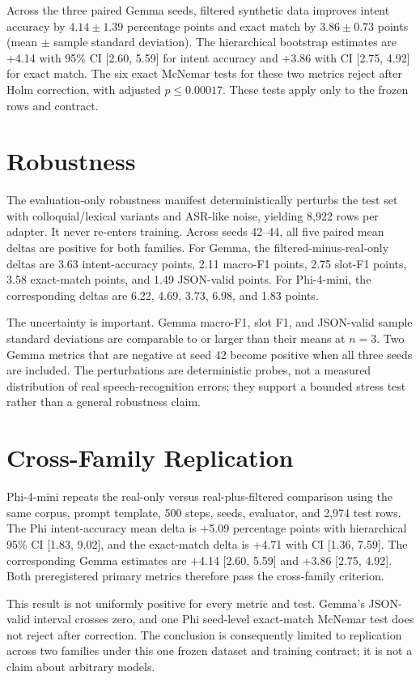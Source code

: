 \documentclass[11pt]{article}
\begin{document}
Across the three paired Gemma seeds, filtered synthetic data improves intent
accuracy by \(4.14 \pm 1.39\) percentage points and exact match by
\(3.86 \pm 0.73\) points (mean \(\pm\) sample standard deviation).  The
hierarchical bootstrap estimates are +4.14 with 95\% CI [2.60, 5.59] for intent
accuracy and +3.86 with CI [2.75, 4.92] for exact match.  The six exact McNemar
tests for these two metrics reject after Holm correction, with adjusted
\(p \leq 0.00017\).  These tests apply only to the frozen rows and contract.

\section{Robustness}
The evaluation-only robustness manifest deterministically perturbs the test set
with colloquial/lexical variants and ASR-like noise, yielding 8,922 rows per
adapter.  It never re-enters training.  Across seeds 42--44, all five paired mean
deltas are positive for both families.  For Gemma, the filtered-minus-real-only
deltas are 3.63 intent-accuracy points, 2.11 macro-F1 points, 2.75 slot-F1 points,
3.58 exact-match points, and 1.49 JSON-valid points.  For Phi-4-mini, the
corresponding deltas are 6.22, 4.69, 3.73, 6.98, and 1.83 points.

The uncertainty is important.  Gemma macro-F1, slot F1, and JSON-valid sample
standard deviations are comparable to or larger than their means at \(n=3\).
Two Gemma metrics that are negative at seed 42 become positive when all three
seeds are included.  The perturbations are deterministic probes, not a measured
distribution of real speech-recognition errors; they support a bounded stress
test rather than a general robustness claim.

\section{Cross-Family Replication}
Phi-4-mini repeats the real-only versus real-plus-filtered comparison using the
same corpus, prompt template, 500 steps, seeds, evaluator, and 2,974 test rows.
The Phi intent-accuracy mean delta is +5.09 percentage points with hierarchical
95\% CI [1.83, 9.02], and the exact-match delta is +4.71 with CI [1.36, 7.59].
The corresponding Gemma estimates are +4.14 [2.60, 5.59] and +3.86 [2.75, 4.92].
Both preregistered primary metrics therefore pass the cross-family criterion.

This result is not uniformly positive for every metric and test.  Gemma's
JSON-valid interval crosses zero, and one Phi seed-level exact-match McNemar test
does not reject after correction.  The conclusion is consequently limited to
replication across two families under this one frozen dataset and training
contract; it is not a claim about arbitrary models.
\end{document}
